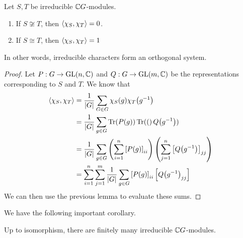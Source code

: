 \begin{boxtheorem} \label{Ch2:Thm:Orth_Char}
    Let $S, T$ be irreducible $\mathbb{C} G$-modules.
    \begin{enumerate}[label = \normalfont \arabic*., noitemsep]
        \item If $S \not\cong T$, then $\left\langle \chi_S, \chi_T \right\rangle = 0$.
        \item If $S \cong T$, then $\left\langle \chi_S, \chi_T \right\rangle = 1$
    \end{enumerate}
    In other words, irreducible characters form an orthogonal system.
\end{boxtheorem}
\begin{proof}
    Let $P : G \to \operatorname{GL}\!\left( n, \mathbb{C} \right)$ and $Q : G \to \operatorname{GL}\!\left( m, \mathbb{C} \right)$ be the representations corresponding to $S$ and $T$. We know that
    \begin{align*}
        \left\langle \chi_S, \chi_T \right\rangle &=
        \frac{1}{\left\lvert G \right\rvert} \sum_{G \in G} \chi_S(g) \chi_T\!\left( g^{-1} \right) \\
        &= \frac{1}{\left\lvert G \right\rvert} \sum_{g \in G} \operatorname{Tr}\!\left( P(g) \right) \operatorname{Tr}\!\left( ( \right)Q\!\left( g^{-1} \right)) \\
        &= \frac{1}{\left\lvert G \right\rvert} \sum_{g \in G} \left( \sum_{i = 1}^{n} \left[ P(g) \right]_{ii} \right)\left( \sum_{j=1}^{n} \left[ Q\!\left( g^{-1} \right) \right]_{jj} \right) \\
        &= \sum_{i=1}^{n} \sum_{j=1}^{m} \frac{1}{\left\lvert G \right\rvert} \sum_{g \in G} \left[ P(g) \right]_{ii} \left[ Q\!\left( g^{-1} \right)_{jj} \right]
    \end{align*}
    We can then use the previous lemma to evaluate these sums.
\end{proof}

We have the following important corollary.

\begin{corollary}
    Up to isomorphism, there are finitely many irreducible $\mathbb{C} G$-modules.
\end{corollary}